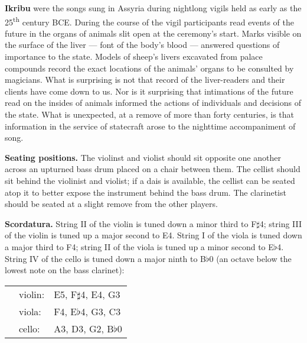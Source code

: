 \textbf{Ikribu} were the songs sung in Assyria during nightlong vigils held as
early as the 25\textsuperscript{th} century BCE. During the course of the vigil
participants read events of the future in the organs of animals slit open at
the ceremony's start. Marks visible on the surface of the liver --- font of the
body's blood --- answered questions of importance to the state. Models of
sheep's livers excavated from palace compounds record the exact locations of
the animals' organs to be consulted by magicians. What is surprising is not
that record of the liver-readers and their clients have come down to us. Nor is
it surprising that intimations of the future read on the insides of animals
informed the actions of individuals and decisions of the state. What is
unexpected, at a remove of more than forty centuries, is that information in
the service of statecraft arose to the nighttime accompaniment of song.

\textbf{Seating positions.} The violinst and violist should sit opposite one
another across an upturned bass drum placed on a chair between them. The
cellist should sit behind the violinist and violist; if a dais is available,
the cellist can be seated atop it to better expose the instrument behind the
bass drum. The clarinetist should be seated at a slight remove from the other
players.

\textbf{Scordatura.} String II of the violin is tuned down a minor third to
F$\sharp$4; string III of the violin is tuned up a major second to E4. String I
of the viola is tuned down a major third to F4; string II of the viola is tuned
up a minor second to E$\flat$4. String IV of the cello is tuned down a major
ninth to B$\flat$0 (an octave below the lowest note on the bass clarinet):

\begin{tabu}{l l l}
\phantom{M} & violin: & E5, F$\sharp$4, E4, G3 \\
            & viola: & F4, E$\flat$4, G3, C3 \\
            & cello: & A3, D3, G2, B$\flat$0 \\
\end{tabu}

